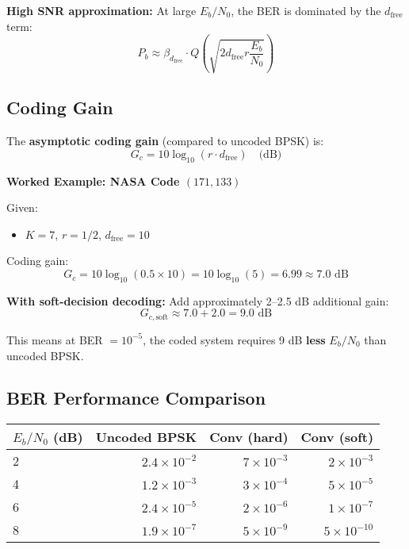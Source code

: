 \textbf{High SNR approximation:} At large $E_b/N_0$, the BER is dominated by the $d_{\text{free}}$ term:
\begin{equation}
P_b \approx \beta_{d_{\text{free}}} \cdot Q\left(\sqrt{2 d_{\text{free}} r \frac{E_b}{N_0}}\right)
\label{eq:ber-high-snr}
\end{equation}

\subsection{Coding Gain}

The \textbf{asymptotic coding gain} (compared to uncoded BPSK) is:
\begin{equation}
G_c = 10 \log_{10}(r \cdot d_{\text{free}}) \quad \text{(dB)}
\label{eq:coding-gain}
\end{equation}

\textbf{Worked Example: NASA Code $(171, 133)$}

Given:
\begin{itemize}
\item $K = 7$, $r = 1/2$, $d_{\text{free}} = 10$
\end{itemize}

Coding gain:
\begin{equation}
G_c = 10 \log_{10}(0.5 \times 10) = 10 \log_{10}(5) = 6.99 \approx 7.0 \text{ dB}
\end{equation}

\textbf{With soft-decision decoding:} Add approximately 2--2.5 dB additional gain:
\begin{equation}
G_{c,\text{soft}} \approx 7.0 + 2.0 = 9.0 \text{ dB}
\end{equation}

This means at BER $= 10^{-5}$, the coded system requires 9 dB \textbf{less} $E_b/N_0$ than uncoded BPSK.

\subsection{BER Performance Comparison}

\begin{center}
\begin{tabular}{@{}lrrr@{}}
\toprule
\textbf{$E_b/N_0$ (dB)} & \textbf{Uncoded BPSK} & \textbf{Conv (hard)} & \textbf{Conv (soft)} \\
\midrule
2 & $2.4 \times 10^{-2}$ & $7 \times 10^{-3}$ & $2 \times 10^{-3}$ \\
4 & $1.2 \times 10^{-3}$ & $3 \times 10^{-4}$ & $5 \times 10^{-5}$ \\
6 & $2.4 \times 10^{-5}$ & $2 \times 10^{-6}$ & $1 \times 10^{-7}$ \\
8 & $1.9 \times 10^{-7}$ & $5 \times 10^{-9}$ & $5 \times 10^{-10}$ \\
\bottomrule
\end{tabular}
\end{center}

